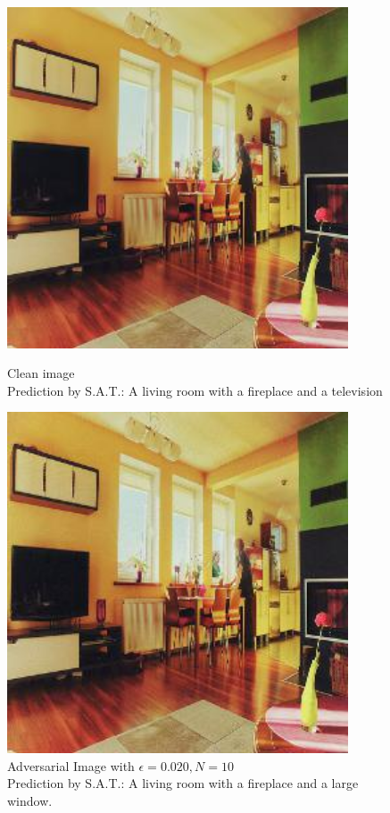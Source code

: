 \begin{figure}[ht]
    \centering
    \begin{minipage}{0.45\textwidth}
        \centering
        \includegraphics[width=0.9\textwidth]{figures/ShowDistractAndDeceive/n=10/samples/0.000/img_0.jpg} %
        \caption*{Clean image\\Prediction by S.A.T.: A living room with a fireplace and a television}
    \end{minipage}\hfill
    \begin{minipage}{0.45\textwidth}
        \centering
        \includegraphics[width=0.9\textwidth]{figures/ShowDistractAndDeceive/n=10/samples/0.020/img_0.jpg} %
        \caption*{Adversarial Image with $\epsilon=0.020, N=10$\\Prediction by S.A.T.: A living room with a fireplace and a large window.}
    \end{minipage}
\end{figure}

